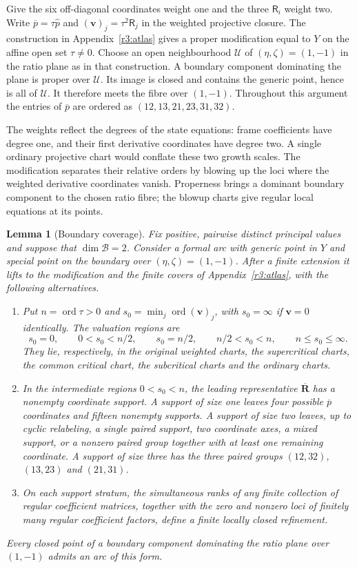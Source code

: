 \documentclass[11pt,a4paper]{article}
\numberwithin{equation}{section}
\theoremstyle{plain}
\newtheorem{lemma}[theorem]{Lemma}
\theoremstyle{definition}
\theoremstyle{remark}
\begin{document}
Give the six off-diagonal coordinates weight one and the three
$\mathsf R_i$ weight two. Write
$\overline p=\tau\widehat p$ and $(\boldsymbol v)_j=\tau^2\mathsf R_j$ in the
weighted projective closure. The construction in
Appendix~\ref{r3:atlas} gives a proper modification equal to $Y$ on
the affine open set $\tau\ne0$. Choose an open neighbourhood
$\mathscr U$ of $(\eta,\zeta)=(1,-1)$ in the ratio plane as in that
construction. A boundary component dominating the plane is proper over
$\mathscr U$. Its image is closed and contains the generic point, hence
is all of $\mathscr U$. It therefore meets the fibre over $(1,-1)$.
Throughout this argument the entries of $\overline p$ are ordered as
$(12,13,21,23,31,32)$.

The weights reflect the degrees of the state equations: frame
coefficients have degree one, and their first derivative
coordinates have degree two. A single ordinary projective chart
would conflate these two growth scales. The modification separates
their relative orders by blowing up the loci where the weighted
derivative coordinates vanish. Properness brings a dominant
boundary component to the chosen ratio fibre; the blowup charts
give regular local equations at its points.

\begin{lemma}[Boundary coverage]\label{r3:boundarycoverage}
Fix positive, pairwise distinct principal values and suppose that
$\dim\mathscr B=2$. Consider a formal arc with generic point in $Y$
and special point on the boundary over $(\eta,\zeta)=(1,-1)$.
After a finite extension it lifts to the modification and the finite
covers of Appendix~\ref{r3:atlas}, with the following alternatives.
\begin{enumerate}[label=\textup{(\roman*)},leftmargin=*]
\item Put $n=\operatorname{ord}\tau>0$ and
$s_0=\min_j\operatorname{ord}(\boldsymbol v)_j$, with $s_0=\infty$
if $\boldsymbol v=0$ identically. The valuation regions are
\[
 s_0=0,\qquad 0<s_0<n/2,\qquad s_0=n/2,\qquad
 n/2<s_0<n,\qquad n\le s_0\le\infty.
\]
They lie, respectively, in the original weighted charts, the
supercritical charts, the common critical chart, the subcritical
charts and the ordinary charts.
\item In the intermediate regions $0<s_0<n$, the leading
representative $\overline{\boldsymbol R}$ has a nonempty coordinate
support. A support of size one leaves four possible
$\overline p$ coordinates and fifteen nonempty supports. A support of
size two leaves, up to cyclic relabeling, a single paired support,
two coordinate axes, a mixed support, or a nonzero paired group
together with at least one remaining coordinate. A support of size three has the three paired
groups $(12,32)$, $(13,23)$ and $(21,31)$.
\item On each support stratum, the simultaneous ranks of any finite
collection of regular coefficient matrices, together with the zero
and nonzero loci of finitely many regular coefficient factors,
define a finite locally closed refinement.
\end{enumerate}
Every closed point of a boundary component dominating the ratio plane over
$(1,-1)$ admits an arc of this form.
\end{lemma}
\end{document}
